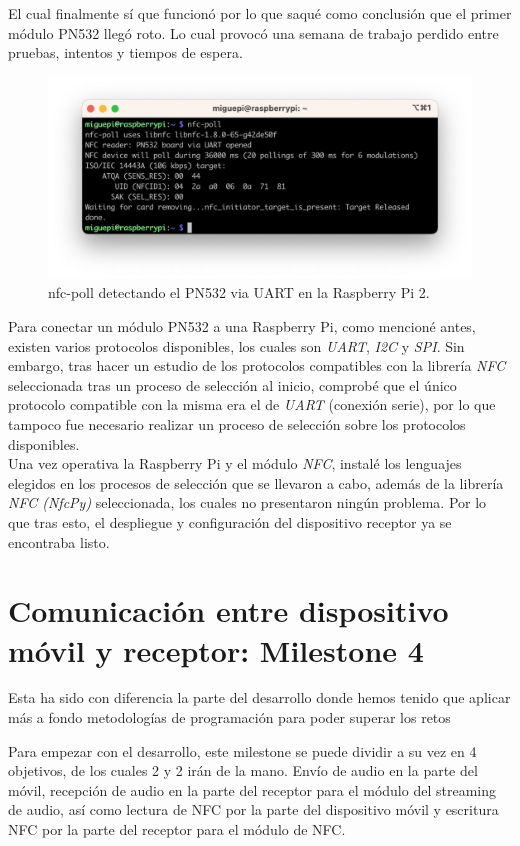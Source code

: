 El cual finalmente sí que funcionó por lo que saqué como conclusión que el primer
módulo PN532 llegó roto. Lo cual provocó una semana de trabajo perdido entre
pruebas, intentos y tiempos de espera.

\begin{figure}[ht]
    \centering
    \includegraphics[width=\textwidth]{fotos/nfc_poll.jpeg}
    \caption{nfc-poll detectando el PN532 via UART en la Raspberry Pi 2.}
\end{figure}

Para conectar un módulo PN532 a una Raspberry Pi, como mencioné antes, existen
varios protocolos disponibles, los cuales son \emph{UART}, \emph{I2C} y
\emph{SPI}. Sin embargo, tras hacer un estudio de los protocolos compatibles con
la librería \emph{NFC} seleccionada tras un proceso de selección al inicio,
comprobé que el único protocolo compatible con la misma era el de \emph{UART}
(conexión serie), por lo que tampoco fue necesario realizar un proceso de
selección sobre los protocolos disponibles.\\

Una vez operativa la Raspberry Pi y el módulo \emph{NFC}, instalé los lenguajes
elegidos en los procesos de selección que se llevaron a cabo, además de la
librería \emph{NFC (NfcPy)} seleccionada, los cuales no presentaron ningún
problema. Por lo que tras esto, el despliegue y configuración del dispositivo
receptor ya se encontraba listo.


\section{Comunicación entre dispositivo móvil y receptor: Milestone 4}

Esta ha sido con diferencia la parte del desarrollo donde hemos tenido que
aplicar más a fondo metodologías de programación para poder superar los retos

Para empezar con el desarrollo, este milestone se puede dividir a su vez en 4
objetivos, de los cuales 2 y 2 irán de la mano. Envío de audio en la parte del
móvil, recepción de audio en la parte del receptor para el módulo del streaming
de audio, así como lectura de NFC por la parte del dispositivo móvil y escritura
NFC por la parte del receptor para el módulo de NFC.

